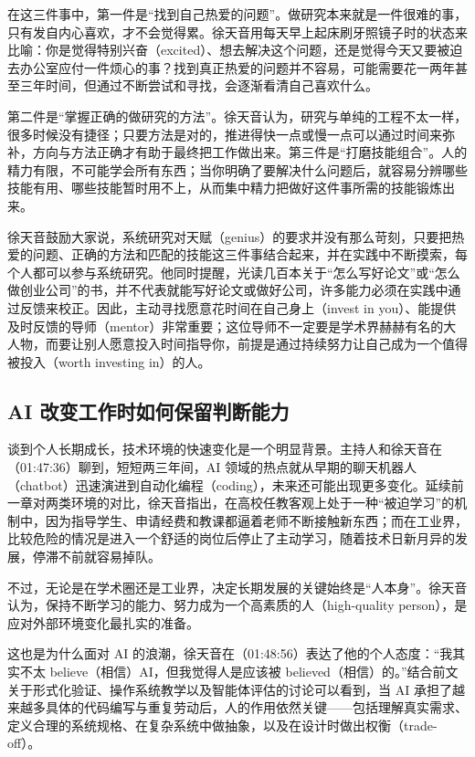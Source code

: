 \documentclass[UTF8,a4paper,11pt,fontset=fandol]{ctexart}
\begin{document}
在这三件事中，第一件是“找到自己热爱的问题”。做研究本来就是一件很难的事，只有发自内心喜欢，才不会觉得累。徐天音用每天早上起床刷牙照镜子时的状态来比喻：你是觉得特别兴奋（excited）、想去解决这个问题，还是觉得今天又要被迫去办公室应付一件烦心的事？找到真正热爱的问题并不容易，可能需要花一两年甚至三年时间，但通过不断尝试和寻找，会逐渐看清自己喜欢什么。

第二件是“掌握正确的做研究的方法”。徐天音认为，研究与单纯的工程不太一样，很多时候没有捷径；只要方法是对的，推进得快一点或慢一点可以通过时间来弥补，方向与方法正确才有助于最终把工作做出来。第三件是“打磨技能组合”。人的精力有限，不可能学会所有东西；当你明确了要解决什么问题后，就容易分辨哪些技能有用、哪些技能暂时用不上，从而集中精力把做好这件事所需的技能锻炼出来。

徐天音鼓励大家说，系统研究对天赋（genius）的要求并没有那么苛刻，只要把热爱的问题、正确的方法和匹配的技能这三件事结合起来，并在实践中不断摸索，每个人都可以参与系统研究。他同时提醒，光读几百本关于“怎么写好论文”或“怎么做创业公司”的书，并不代表就能写好论文或做好公司，许多能力必须在实践中通过反馈来校正。因此，主动寻找愿意花时间在自己身上（invest in you）、能提供及时反馈的导师（mentor）非常重要；这位导师不一定要是学术界赫赫有名的大人物，而要让别人愿意投入时间指导你，前提是通过持续努力让自己成为一个值得被投入（worth investing in）的人。

\subsection{AI 改变工作时如何保留判断能力}
谈到个人长期成长，技术环境的快速变化是一个明显背景。主持人和徐天音在（01:47:36）聊到，短短两三年间，AI 领域的热点就从早期的聊天机器人（chatbot）迅速演进到自动化编程（coding），未来还可能出现更多变化。延续前一章对两类环境的对比，徐天音指出，在高校任教客观上处于一种“被迫学习”的机制中，因为指导学生、申请经费和教课都逼着老师不断接触新东西；而在工业界，比较危险的情况是进入一个舒适的岗位后停止了主动学习，随着技术日新月异的发展，停滞不前就容易掉队。

不过，无论是在学术圈还是工业界，决定长期发展的关键始终是“人本身”。徐天音认为，保持不断学习的能力、努力成为一个高素质的人（high-quality person），是应对外部环境变化最扎实的准备。

这也是为什么面对 AI 的浪潮，徐天音在（01:48:56）表达了他的个人态度：“我其实不太 believe（相信）AI，但我觉得人是应该被 believed（相信）的。”结合前文关于形式化验证、操作系统教学以及智能体评估的讨论可以看到，当 AI 承担了越来越多具体的代码编写与重复劳动后，人的作用依然关键——包括理解真实需求、定义合理的系统规格、在复杂系统中做抽象，以及在设计时做出权衡（trade-off）。
\end{document}
